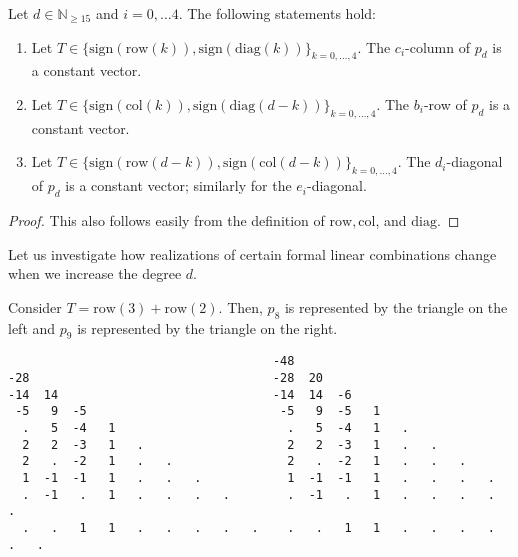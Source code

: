   \begin{proposition}
    Let \( d \in \mathbb{N}_{\geq 15} \) and \( i = 0, \dots 4 \).
    The following statements hold:
    \begin{enumerate}
    \item Let $T \in \{\mathrm{sign}(\mathrm{row}(k)), \mathrm{sign}(\mathrm{diag}(k)) \}_{k = 0, \dots, 4}$. The $c_{i}$-column of $p_d$ is a constant vector. 
  
    \item Let $T \in \{\mathrm{sign}( \mathrm{col}(k)),\mathrm{sign}(\mathrm{diag}(d-k)) \}_{k = 0, \dots, 4}$. The $b_{i}$-row of $p_d$ is a constant vector. 
  
    \item Let $T \in \{ \mathrm{sign}(\mathrm{row}(d-k)), \mathrm{sign}(\mathrm{col}(d-k)) \}_{k = 0, \dots, 4}$. The $d_{i}$-diagonal of $p_d$ is a constant vector; similarly for the $e_{i}$-diagonal. 
    \end{enumerate}
  \end{proposition}
  
  \begin{proof}
    This also follows easily from the definition of $\mathrm{row}, \mathrm{col}$, and \(\mathrm{diag} \). 
  \end{proof}
  

  Let us investigate how realizations of certain formal linear combinations change when we increase the degree \( d \). 

  \begin{example}
    Consider \( T = \mathrm{row}(3) + \mathrm{row}(2) \). Then, \( p_8 \) is represented by the triangle on the left and \( p_9 \) is represented by the triangle on the right.
    \begin{verbatim}
                                     -48
-28                                  -28  20
-14  14                              -14  14  -6
 -5   9  -5                           -5   9  -5   1
  .   5  -4   1                        .   5  -4   1   . 
  2   2  -3   1   .                    2   2  -3   1   .   .
  2   .  -2   1   .   .                2   .  -2   1   .   .   .
  1  -1  -1   1   .   .   .            1  -1  -1   1   .   .   .   .
  .  -1   .   1   .   .   .   .        .  -1   .   1   .   .   .   .   .
  .   .   1   1   .   .   .   .   .    .   .   1   1   .   .   .   .   .   .
    \end{verbatim}
  \end{example}

